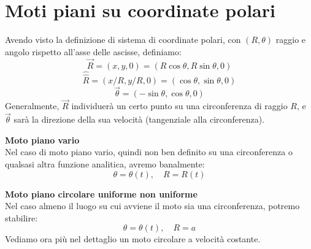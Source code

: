 \documentclass[a4paper,12pt]{article}
\begin{document}
\section{Moti piani su coordinate polari}
Avendo visto la definizione di sistema di coordinate polari, con $(R, \theta)$ raggio e angolo rispetto all'asse
delle ascisse, definiamo:
$$ \vec{R} = (x, y, 0) = (R\cos{\theta}, R\sin{\theta}, 0) $$
$$ \hat{\hat{R}} = (x / R, y / R, 0) = (\cos\theta, \sin\theta, 0) $$
$$ \vec{\theta} = (-\sin\theta, \cos\theta, 0) $$
Generalmente, $\vec{R}$ individuerà un certo punto su una circonferenza di raggio $R$, e $\vec{\theta}$ sarà
la direzione della sua velocità (tangenziale alla circonferenza).
\par\smallskip
\textbf{Moto piano vario} \\
Nel caso di moto piano vario, quindi non ben definito su una circonferenza o qualsasi altra funzione analitica, 
avremo banalmente:
$$ \theta = \theta(t), \quad R = R(t) $$
\par\smallskip
\textbf{Moto piano circolare uniforme non uniforme} \\
Nel caso almeno il luogo su cui avviene il moto sia una circonferenza, potremo stabilire:
$$ \theta = \theta(t), \quad R = a $$
Vediamo ora più nel dettaglio un moto circolare a velocità costante.
\end{document}
